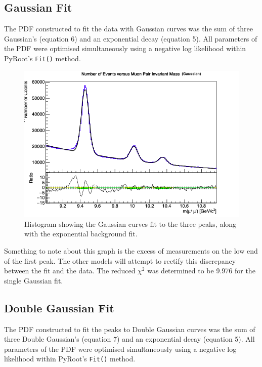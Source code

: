 \subsection*{Gaussian Fit}

The PDF constructed to fit the data with Gaussian curves was the sum of three Gaussian's (equation 6) and an exponential decay (equation 5). All parameters of the PDF were optimised simultaneously using a negative log likelihood within PyRoot's \verb|Fit()| method.

\begin{figure}[H]
\centering
\includegraphics[width=0.7\columnwidth]{figures/xmass_hist_gauss.png}
\caption{Histogram showing the Gaussian curves fit to the three peaks, along with the exponential background fit.}
\label{fig:2d_hists_ex}
\end{figure}

Something to note about this graph is the excess of measurements on the low end of the first peak. The other models will attempt to rectify this discrepancy between the fit and the data. The reduced $\chi ^2$ was determined to be 9.976 for the single Gaussian fit.



\subsection*{Double Gaussian Fit}

The PDF constructed to fit the peaks to Double Gaussian curves was the sum of three Double Gaussian's (equation 7) and an exponential decay (equation 5). All parameters of the PDF were optimised simultaneously using a negative log likelihood within PyRoot's \verb|Fit()| method. 


